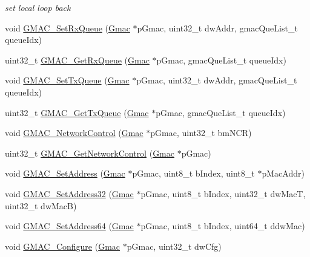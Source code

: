 \begin{DoxyCompactItemize}
\begin{DoxyCompactList}\small\item\em set local loop back \end{DoxyCompactList}\item 
void \mbox{\hyperlink{group__gmac__defines_gab6728c6253143037bbc9c30befe81c19}{G\+M\+A\+C\+\_\+\+Set\+Rx\+Queue}} (\mbox{\hyperlink{structGmac}{Gmac}} $\ast$p\+Gmac, uint32\+\_\+t dw\+Addr, gmac\+Que\+List\+\_\+t queue\+Idx)
\item 
uint32\+\_\+t \mbox{\hyperlink{group__gmac__defines_ga75a37904d053aee0b413914d73b45ff1}{G\+M\+A\+C\+\_\+\+Get\+Rx\+Queue}} (\mbox{\hyperlink{structGmac}{Gmac}} $\ast$p\+Gmac, gmac\+Que\+List\+\_\+t queue\+Idx)
\item 
void \mbox{\hyperlink{group__gmac__defines_ga599028cc27124c0c292562833f31319c}{G\+M\+A\+C\+\_\+\+Set\+Tx\+Queue}} (\mbox{\hyperlink{structGmac}{Gmac}} $\ast$p\+Gmac, uint32\+\_\+t dw\+Addr, gmac\+Que\+List\+\_\+t queue\+Idx)
\item 
uint32\+\_\+t \mbox{\hyperlink{group__gmac__defines_ga639d2d7bdfcd93c39d183b84a5b02a34}{G\+M\+A\+C\+\_\+\+Get\+Tx\+Queue}} (\mbox{\hyperlink{structGmac}{Gmac}} $\ast$p\+Gmac, gmac\+Que\+List\+\_\+t queue\+Idx)
\item 
void \mbox{\hyperlink{group__gmac__defines_ga4dfdc785358f1239d80a46dc2108a15c}{G\+M\+A\+C\+\_\+\+Network\+Control}} (\mbox{\hyperlink{structGmac}{Gmac}} $\ast$p\+Gmac, uint32\+\_\+t bm\+N\+CR)
\item 
uint32\+\_\+t \mbox{\hyperlink{group__gmac__defines_gaa57ed8dc6b5f1584d884e067cad8fb6e}{G\+M\+A\+C\+\_\+\+Get\+Network\+Control}} (\mbox{\hyperlink{structGmac}{Gmac}} $\ast$p\+Gmac)
\item 
void \mbox{\hyperlink{group__gmac__defines_ga52528649e180e7e7ed1b9533ec6337fd}{G\+M\+A\+C\+\_\+\+Set\+Address}} (\mbox{\hyperlink{structGmac}{Gmac}} $\ast$p\+Gmac, uint8\+\_\+t b\+Index, uint8\+\_\+t $\ast$p\+Mac\+Addr)
\item 
void \mbox{\hyperlink{group__gmac__defines_ga12cb5d7dcc37d8fd85ca6edd679ace73}{G\+M\+A\+C\+\_\+\+Set\+Address32}} (\mbox{\hyperlink{structGmac}{Gmac}} $\ast$p\+Gmac, uint8\+\_\+t b\+Index, uint32\+\_\+t dw\+MacT, uint32\+\_\+t dw\+MacB)
\item 
void \mbox{\hyperlink{group__gmac__defines_ga50bcf8daa0c205fc18df7c1bf835cb01}{G\+M\+A\+C\+\_\+\+Set\+Address64}} (\mbox{\hyperlink{structGmac}{Gmac}} $\ast$p\+Gmac, uint8\+\_\+t b\+Index, uint64\+\_\+t ddw\+Mac)
\item 
void \mbox{\hyperlink{group__gmac__defines_ga6939e2e68cc4b238caeab75414dd62b9}{G\+M\+A\+C\+\_\+\+Configure}} (\mbox{\hyperlink{structGmac}{Gmac}} $\ast$p\+Gmac, uint32\+\_\+t dw\+Cfg)

\end{DoxyCompactItemize}
